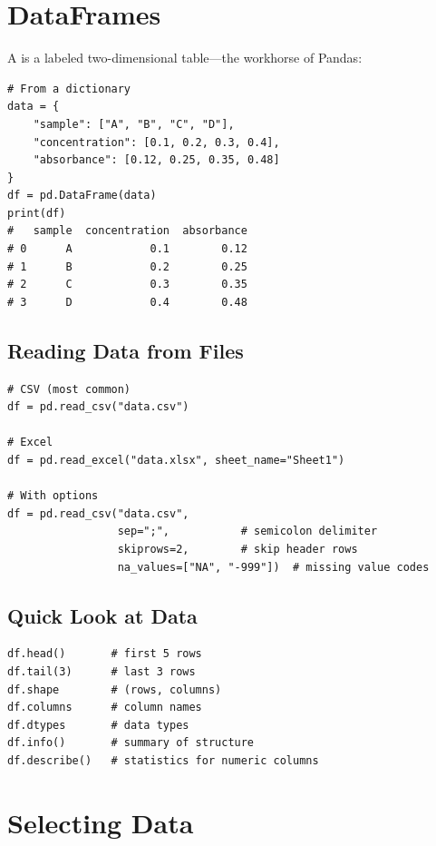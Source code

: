 \section{DataFrames}
\label{sec:dataframes}

A  is a labeled two-dimensional table---the workhorse of Pandas:

\begin{lstlisting}
# From a dictionary
data = {
    "sample": ["A", "B", "C", "D"],
    "concentration": [0.1, 0.2, 0.3, 0.4],
    "absorbance": [0.12, 0.25, 0.35, 0.48]
}
df = pd.DataFrame(data)
print(df)
#   sample  concentration  absorbance
# 0      A            0.1        0.12
# 1      B            0.2        0.25
# 2      C            0.3        0.35
# 3      D            0.4        0.48
\end{lstlisting}

\subsection{Reading Data from Files}

\begin{lstlisting}
# CSV (most common)
df = pd.read_csv("data.csv")

# Excel
df = pd.read_excel("data.xlsx", sheet_name="Sheet1")

# With options
df = pd.read_csv("data.csv",
                 sep=";",           # semicolon delimiter
                 skiprows=2,        # skip header rows
                 na_values=["NA", "-999"])  # missing value codes
\end{lstlisting}

\subsection{Quick Look at Data}

\begin{lstlisting}
df.head()       # first 5 rows
df.tail(3)      # last 3 rows
df.shape        # (rows, columns)
df.columns      # column names
df.dtypes       # data types
df.info()       # summary of structure
df.describe()   # statistics for numeric columns
\end{lstlisting}

\section{Selecting Data}
\label{sec:selecting}

